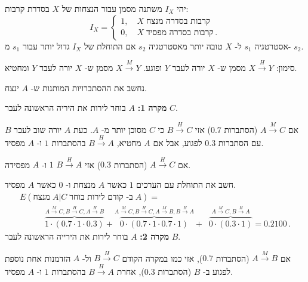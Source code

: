 \solution{}

יהי 
$I_X$
משתנה מסמן עבור הנצחות של 
$X$
בסדרת קרבות:
\[
I_X=
\left\{
\begin{array}{ll}
1,\quad X\;\textrm{קרבות בסדרה מנצח}\\
0, \quad X\; \textrm{קרבות בסדרה מפסיד}\,.
\end{array}
\right.
\]
אסטרטגיה
$s_1$
ל-%
$X$
טובה יותר מאסטרטגיה
$s_2$
אם התוחלת של
$I_X$
גדול יותר עבור 
$s_1$
מ-%
$s_2$.

סימון:
$X\stackrel{H}{\longrightarrow}Y$
מסמן ש-%
$X$
יורה לעבר
$Y$
ופוגע.
$X\stackrel{M}{\longrightarrow}Y$
מסמן ש-%
$X$
יורה לעבר
$Y$
ומחטיא.

נחשב את ההסתברויות המותנות ש-%
$A$
ינצח.

\textbf{מקרה 1:} 
$A$
בוחר לירות את היריה הראשונה לעבר 
$C$.

אם 
$A\stackrel{M}{\longrightarrow}C$
(הסתברות
$0.7$)
אזי
$B\stackrel{H}{\longrightarrow}C$
כי
$C$
מסוכן יותר מ-%
$A$.
כעת
$A$
יורה שוב לעבר 
$B$
עם הסתברות
$0.3$
לפגוע, אבל אם
$A$
מחטיא,
$B\stackrel{H}{\longrightarrow}A$
בהסתברות
$1$
ו-%
$A$
מפסיד.

אם
$A\stackrel{H}{\longrightarrow}C$
(הסתברות
$0.3$)
אזי
$B\stackrel{H}{\longrightarrow}A$
$1$
ו-%
$A$
מפסידה.

חשב את התוחלת עם הערכים
$1$
כאשר 
$A$
מנצחת ו-%
$0$
כאשר
$A$ 
מפסיד.
\vspace*{-3ex}
\[
\renewcommand*{\arraystretch}{2.5}
\begin{array}{l}
E(\textrm{מנצח}\;A|C\;\textrm{ב- קודם לירות בוחר}\;A) =\\
%
\qquad\quad \overbrace{1\cdot (0.7\cdot 1\cdot 0.3)}%
^{A\stackrel{M}{\longrightarrow}C, 
B\stackrel{H}{\longrightarrow}C,
A\stackrel{H}{\longrightarrow}B}+
%
\overbrace{0\cdot (0.7\cdot 1\cdot 0.7\cdot 1)}%
^{A\stackrel{M}{\longrightarrow}C,
B\stackrel{H}{\longrightarrow}C,
A\stackrel{M}{\longrightarrow}B,
B\stackrel{H}{\longrightarrow}A}+
%
\;\;\overbrace{0\cdot (0.3\cdot 1)}^{A\stackrel{M}{\longrightarrow}C, B\stackrel{H}{\longrightarrow}A}=0.2100\,.
\end{array}
\]
\textbf{מקרה 2:} $A$
בוחר לירות את הירייה הראשונה לעבר 
$B$.

אם
$A\stackrel{M}{\longrightarrow}B$
(הסתברות
$0.7$),
אזי כמו במקרה הקודם
$B\stackrel{H}{\longrightarrow}C$
ול-%
$A$
הזדמנות אחת נוספת לפגוע ב-%
$B$
(הסתברות
$0.3$),
אחרת
$B\stackrel{H}{\longrightarrow}A$
בהסתברות
$1$
ו-%
$A$
מפסיד.

